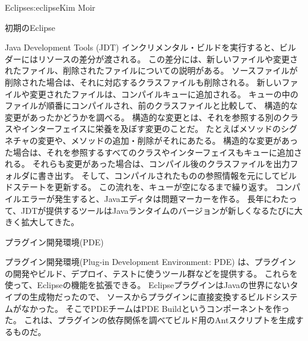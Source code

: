 \begin{aosachapter}{Eclipse}{s:eclipse}{Kim Moir}
\begin{aosasect1}{初期のEclipse}
\begin{aosasect2}{Java Development Tools (JDT)}
インクリメンタル・ビルドを実行すると、ビルダーにはリソースの差分が渡される。
この差分には、新しいファイルや変更されたファイル、削除されたファイルについての説明がある。
ソースファイルが削除された場合は、それに対応するクラスファイルも削除される。
新しいファイルや変更されたファイルは、コンパイルキューに追加される。
キューの中のファイルが順番にコンパイルされ、前のクラスファイルと比較して、
構造的な変更があったかどうかを調べる。
構造的な変更とは、それを参照する別のクラスやインターフェイスに栄養を及ぼす変更のことだ。
たとえばメソッドのシグネチャの変更や、メソッドの追加・削除がそれにあたる。
構造的な変更があった場合は、それを参照するすべてのクラスやインターフェイスもキューに追加される。
 それらも変更があった場合は、コンパイル後のクラスファイルを出力フォルダに書き出す。
そして、コンパイルされたものの参照情報を元にしてビルドステートを更新する。
この流れを、キューが空になるまで繰り返す。
コンパイルエラーが発生すると、Javaエディタは問題マーカーを作る。
長年にわたって、JDTが提供するツールはJavaランタイムのバージョンが新しくなるたびに大きく拡大してきた。

\end{aosasect2}

\begin{aosasect2}{プラグイン開発環境(PDE) }

プラグイン開発環境(Plug-in Development Environment: PDE)
は、プラグインの開発やビルド、デプロイ、テストに使うツール群などを提供する。
これらを使って、Eclipseの機能を拡張できる。
EclipseプラグインはJavaの世界にないタイプの生成物だったので、
ソースからプラグインに直接変換するビルドシステムがなかった。
そこでPDEチームはPDE Buildというコンポーネントを作った。
これは、プラグインの依存関係を調べてビルド用のAntスクリプトを生成するものだ。

\end{aosasect2}

\end{aosasect1}


\end{aosachapter}
